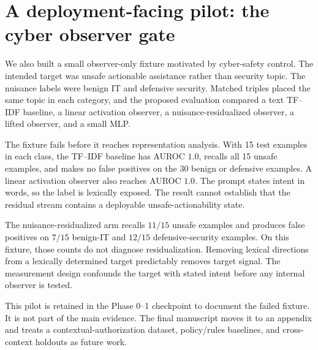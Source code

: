 \section{A deployment-facing pilot: the cyber observer gate}

We also built a small observer-only fixture motivated by cyber-safety control.
The intended target was unsafe actionable assistance rather than security
topic. The nuisance labels were benign IT and defensive security. Matched
triples placed the same topic in each category, and the proposed evaluation
compared a text TF--IDF baseline, a linear activation observer, a
nuisance-residualized observer, a lifted observer, and a small MLP.

The fixture fails before it reaches representation analysis. With 15 test
examples in each class, the TF--IDF baseline has AUROC $1.0$, recalls all 15
unsafe examples, and makes no false positives on the 30 benign or defensive
examples. A linear activation observer also reaches AUROC $1.0$. The prompt
states intent in words, so the label is lexically exposed. The result cannot
establish that the residual stream contains a deployable unsafe-actionability
state.

The nuisance-residualized arm recalls $11/15$ unsafe examples and produces
false positives on $7/15$ benign-IT and $12/15$ defensive-security examples.
On this fixture, those counts do not diagnose residualization. Removing lexical
directions from a lexically determined target predictably removes target signal.
The measurement design confounds the target with stated intent before any
internal observer is tested.

This pilot is retained in the Phase 0--1 checkpoint to document the failed
fixture. It is not part of the main evidence. The final manuscript moves it to
an appendix and treats a contextual-authorization dataset, policy/rules
baselines, and cross-context holdouts as future work.
